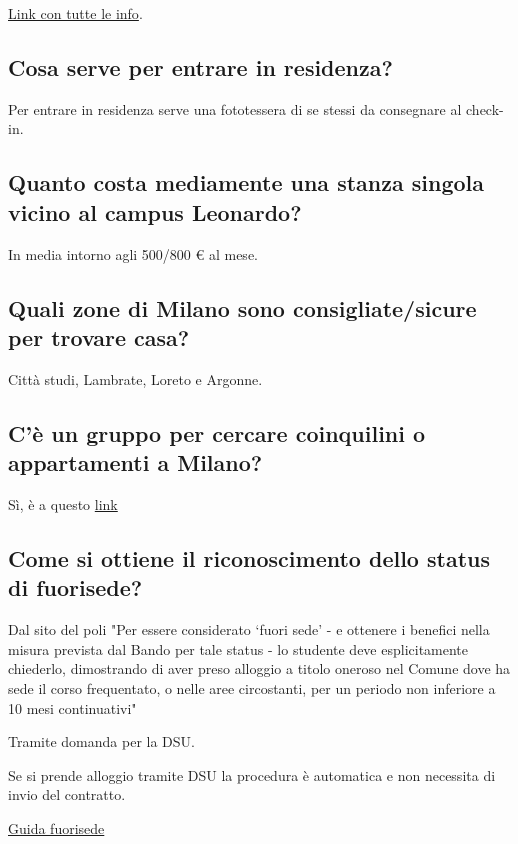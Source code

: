 \documentclass[legal]{polinetwork}
\begin{document}
\href{https://www.residenze.polimi.it}{Link con tutte le info}.

\subsection{Cosa serve per entrare in residenza?}


Per entrare in residenza serve una fototessera di se stessi da consegnare al check-in.

\subsection{Quanto costa mediamente una stanza singola vicino al campus Leonardo?}


In media intorno agli 500/800 € al mese.

\subsection{Quali zone di Milano sono consigliate/sicure per trovare casa?}


Città studi, Lambrate, Loreto e Argonne.

\subsection{C'è un gruppo per cercare coinquilini o appartamenti a Milano?}


Sì, è a questo \href{https://t.me/joinchat/jmpNOitFNFw1MzJk}{link}

\subsection{Come si ottiene il riconoscimento dello status di fuorisede?}


Dal sito del poli "Per essere considerato ‘fuori sede' - e ottenere i benefici nella misura prevista dal Bando per tale status - lo studente deve esplicitamente chiederlo, dimostrando di aver preso alloggio a titolo oneroso nel Comune dove ha sede il corso frequentato, o nelle aree circostanti, per un periodo non inferiore a 10 mesi continuativi"

Tramite domanda per la DSU.

Se si prende alloggio tramite DSU la procedura è automatica e non necessita di invio del contratto.

\href{https://www.polimi.it/studenti/tasse-borse-e-agevolazioni/diritto-allo-studio}{Guida fuorisede}
\end{document}
